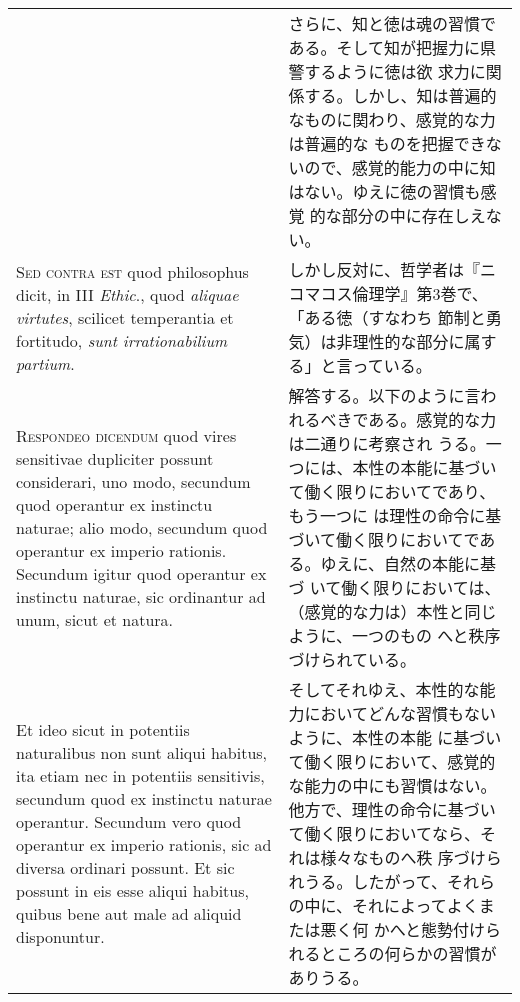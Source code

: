 \documentclass[10pt]{jsarticle} %
\begin{document}
\begin{longtable}{p{21em}p{21em}}
&

さらに、知と徳は魂の習慣である。そして知が把握力に県警するように徳は欲
求力に関係する。しかし、知は普遍的なものに関わり、感覚的な力は普遍的な
ものを把握できないので、感覚的能力の中に知はない。ゆえに徳の習慣も感覚
的な部分の中に存在しえない。

\\



{\scshape Sed contra est} quod philosophus dicit, in III {\itshape
 Ethic}., quod {\itshape aliquae virtutes}, scilicet temperantia et
 fortitudo, {\itshape sunt irrationabilium partium}.

&

しかし反対に、哲学者は『ニコマコス倫理学』第3巻で、「ある徳（すなわち
 節制と勇気）は非理性的な部分に属する」と言っている。

\\



{\scshape Respondeo dicendum} quod vires sensitivae dupliciter possunt
 considerari, uno modo, secundum quod operantur ex instinctu naturae;
 alio modo, secundum quod operantur ex imperio rationis. Secundum
 igitur quod operantur ex instinctu naturae, sic ordinantur ad unum,
 sicut et natura. 


&

解答する。以下のように言われるべきである。感覚的な力は二通りに考察され
うる。一つには、本性の本能に基づいて働く限りにおいてであり、もう一つに
は理性の命令に基づいて働く限りにおいてである。ゆえに、自然の本能に基づ
 いて働く限りにおいては、（感覚的な力は）本性と同じように、一つのもの
 へと秩序づけられている。

\\


Et ideo sicut in potentiis naturalibus non sunt
 aliqui habitus, ita etiam nec in potentiis sensitivis, secundum quod
 ex instinctu naturae operantur. Secundum vero quod operantur ex
 imperio rationis, sic ad diversa ordinari possunt. Et sic possunt in
 eis esse aliqui habitus, quibus bene aut male ad aliquid disponuntur.

&

そしてそれゆえ、本性的な能力においてどんな習慣もないように、本性の本能
 に基づいて働く限りにおいて、感覚的な能力の中にも習慣はない。
他方で、理性の命令に基づいて働く限りにおいてなら、それは様々なものへ秩
 序づけられうる。したがって、それらの中に、それによってよくまたは悪く何
 かへと態勢付けられるところの何らかの習慣がありうる。


\end{longtable}
\end{document}
